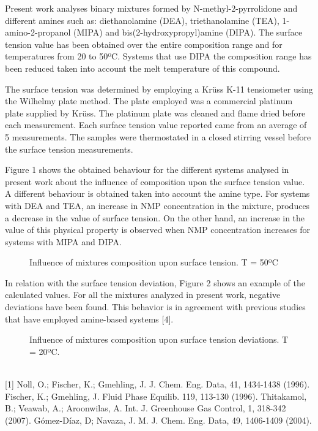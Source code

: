 Present work analyses binary mixtures formed by N-methyl-2-pyrrolidone
and different amines such as: diethanolamine (DEA), triethanolamine (TEA),
1-amino-2-propanol (MIPA) and bis(2-hydroxypropyl)amine (DIPA). The surface
tension value has been obtained over the entire composition range and for
temperatures from 20 to 50ºC. Systems that use DIPA the composition range has
been reduced taken into account the melt temperature of this compound.

The surface tension was determined by employing a Krüss K-11 tensiometer
using the Wilhelmy plate method. The plate employed was a commercial platinum
plate supplied by Krüss. The platinum plate was cleaned and flame dried before each
measurement. Each surface tension value reported came from an average of 5
measurements. The samples were thermostated in a closed stirring vessel before the
surface tension measurements.

Figure 1 shows the obtained behaviour for the different systems analysed in
present work about the influence of composition upon the surface tension value. A
different behaviour is obtained taken into account the amine type. For systems with
DEA and TEA, an increase in NMP concentration in the mixture, produces a
decrease in the value of surface tension. On the other hand, an increase in the value
of this physical property is observed when NMP concentration increases for systems
with MIPA and DIPA.

\newpage
\begin{figure}[h]
 \centerline{}
 \caption[]{ Influence of mixtures composition upon surface tension. T = 50ºC}\label{figure 1}
\end{figure}
In relation with the surface tension deviation, Figure 2 shows an example of
the calculated values. For all the mixtures analyzed in present work, negative
deviations have been found. This behavior is in agreement with previous studies that
have employed amine-based systems [4].
\\
\begin{figure}[h]
 \centerline{}
 \caption[]{Influence of mixtures composition upon surface tension deviations. T = 20ºC.}\label{figure 1}
\end{figure}
\\
{\footnotesize
[1] Noll, O.; Fischer, K.; Gmehling, J. J. Chem. Eng. Data, 41, 1434-1438 (1996).
\newline
[2] Fischer, K.; Gmehling, J. Fluid Phase Equilib. 119, 113-130 (1996).
\newline
[3] Thitakamol, B.; Veawab, A.; Aroonwilas, A. Int. J. Greenhouse Gas Control, 1, 318-342 (2007).
\newline
[4] Gómez-Díaz, D; Navaza, J. M. J. Chem. Eng. Data, 49, 1406-1409 (2004).
}

